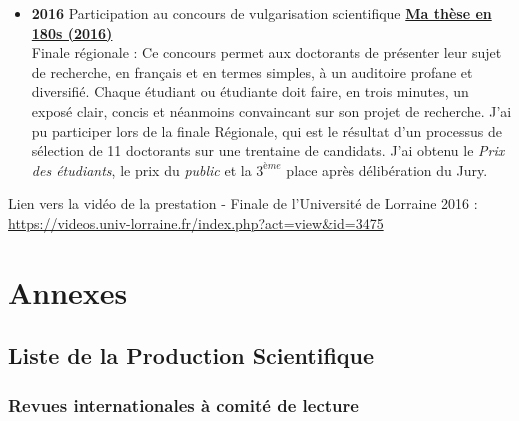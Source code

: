 \documentclass[
  12pt,
  oneside]{book}
\providecommand{\tightlist}{%
  \setlength{\itemsep}{0pt}\setlength{\parskip}{0pt}}
\begin{document}
\begin{itemize}
\tightlist
\item
  \textbf{2016} Participation au concours de vulgarisation scientifique \href{http://videos.univ-lorraine.fr/index.php?act=view&id=3475}{\textbf{Ma thèse en 180s (2016)}}\\
  Finale régionale : Ce concours permet aux doctorants de présenter leur sujet de recherche, en français et en termes simples, à un auditoire profane et diversifié. Chaque étudiant ou étudiante doit faire, en trois minutes, un exposé clair, concis et néanmoins convaincant sur son projet de recherche.
  J'ai pu participer lors de la finale Régionale, qui est le résultat d'un processus de sélection de 11 doctorants sur une trentaine de candidats.
  J'ai obtenu le \textit{Prix des étudiants}, le prix du \textit{public} et la \(3^{ème}\) place après délibération du Jury.
\end{itemize}

Lien vers la vidéo de la prestation - Finale de l'Université de Lorraine 2016 :
\url{https://videos.univ-lorraine.fr/index.php?act=view&id=3475}

\newpage

\appendix

\hypertarget{annexes}{%
\chapter*{Annexes}\label{annexes}}

\renewcommand{\thesection}{\Alph{section}}

\hypertarget{articles}{%
\section{Liste de la Production Scientifique}\label{articles}}

\hypertarget{revues-internationales-uxe0-comituxe9-de-lecture}{%
\subsection{Revues internationales à comité de lecture}\label{revues-internationales-uxe0-comituxe9-de-lecture}}
\end{document}
